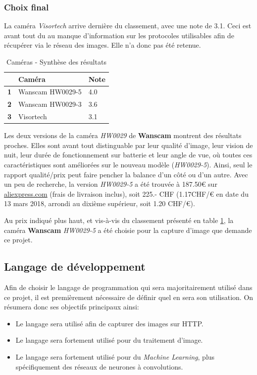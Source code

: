 \subsubsection{Choix final}

La caméra \textit{Visortech} arrive dernière du classement, avec une note de 3.1. Ceci est avant tout du au manque d'information sur les protocoles utilisables afin de récupérer via le réseau des images. Elle n'a donc pas été retenue.

\begin{table}[!ht]
    \centering
    \caption{Caméras - Synthèse des résultats}
    \label{cam:synthese}
    \begin{tabular}{@{}lll@{}}
    \toprule
      & Caméra           & Note \\ \midrule
    \textbf{1} & Wanscam HW0029-5 & 4.0  \\
    \textbf{2} & Wanscam HW0029-3 & 3.6  \\
    \textbf{3} & Visortech        & 3.1  \\ \bottomrule
    \end{tabular}
\end{table}

Les deux versions de la caméra \textit{HW0029} de \textbf{Wanscam} montrent des résultats proches. Elles sont avant tout distinguable par leur qualité d'image, leur vision de nuit, leur durée de fonctionnement sur batterie et leur angle de vue, où toutes ces caractéristiques sont améliorées sur le nouveau modèle (\textit{HW0029-5}). Ainsi, seul le rapport qualité/prix peut faire pencher la balance d'un côté ou d'un autre. Avec un peu de recherche, la version \textit{HW0029-5} a été trouvée à 187.50€ sur \url{aliexpress.com}\autocite{cam:wan5-buy} (frais de livraison inclus), soit 225.- CHF (1.17CHF/€ en date du 13 mars 2018\autocite{util:cours}, arrondi au dixième supérieur, soit 1.20 CHF/€). 

Au prix indiqué plus haut, et vis-à-vis du classement présenté en table \ref{cam:synthese}, la caméra \textbf{Wanscam} \textit{HW0029-5} a été choisie pour la capture d'image que demande ce projet.

\subsection{Langage de développement}
Afin de choisir le langage de programmation qui sera majoritairement utilisé dans ce projet, il est premièrement nécessaire de définir quel en sera son utilisation. On résumera donc ses objectifs principaux ainsi:
\begin{itemize}
    \item Le langage sera utilisé afin de capturer des images sur HTTP.
    \item Le langage sera fortement utilisé pour du traitement d'image.
    \item Le langage sera fortement utilisé pour du \textit{Machine Learning}, plus spécifiquement des réseaux de neurones à convolutions.
\end{itemize}

